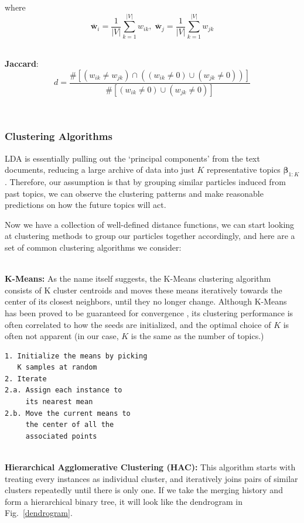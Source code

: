 \documentclass[conference]{IEEEtran}
\begin{document}
where 
\begin{equation*}
	\overline{\mathbf{w}}_i = \frac{1}{|V|}\sum_{k=1}^{|V|}w_{ik},\;
	\overline{\mathbf{w}}_j = \frac{1}{|V|}\sum_{k=1}^{|V|}w_{jk}
\end{equation*}

\-\\
\textbf{Jaccard}: 
\begin{equation*}
	d = \frac{\# \left[(w_{ik} \neq w_{jk})\cap((w_{ik} \neq 0)\cup(w_{jk} \neq 0))\right]}{\#\left[(w_{ik} \neq 0)\cup(w_{jk} \neq 0)\right]}
\end{equation*}

\-\\

\subsubsection{Clustering Algorithms}
LDA is essentially pulling out the `principal components' from the text documents, reducing a large archive of data into just $K$ representative topics $\mathbf{\beta}_{1:K}$. Therefore, our assumption is that by grouping similar particles induced from past topics, we can observe the clustering patterns and make reasonable predictions on how the future topics will act.

Now we have a collection of well-defined distance functions, we can start looking at clustering methods to group our particles together accordingly, and here are a set of common clustering algorithms we consider:

\-\\
\textbf{K-Means:} As the name itself suggests, the K-Means clustering algorithm consists of K cluster centroids and moves these means iteratively towards the center of its closest neighbors, until they no longer change. Although K-Means has been proved to be guaranteed for convergence \cite{selim1984}, its clustering performance is often correlated to how the seeds are initialized, and the optimal choice of $K$ is often not apparent (in our case, $K$ is the same as the number of topics.)

\begin{verbatim}
1. Initialize the means by picking 
   K samples at random
2. Iterate
2.a. Assign each instance to 
     its nearest mean
2.b. Move the current means to 
	 the center of all the 
	 associated points
\end{verbatim}
\-\\
\textbf{Hierarchical Agglomerative Clustering (HAC):} This algorithm starts with treating every instances as individual cluster, and iteratively joins pairs of similar clusters repeatedly until there is only one. If we take the merging history and form a hierarchical binary tree, it will look like the dendrogram in Fig.~\ref{dendrogram}.
\end{document}

